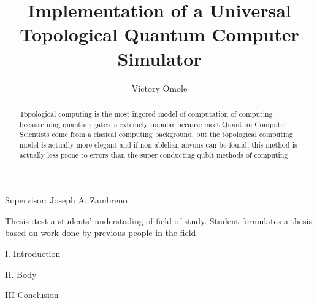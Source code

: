 \documentclass{article}
\begin{document}



\title{Implementation of a Universal Topological Quantum Computer Simulator}

\author{Victory Omole}



\maketitle
\newcommand\supervisor[1]{#1}
\supervisor{Supervisor: Joseph A. Zambreno}
\begin{abstract}
  Topological computing is the most ingored model of computation of computing because uing quantum gates is extemely popular because most Quantum Computer Scientists come from a clasical computing background, but the topological computing model is actually more elegant and if non-ablelian anyons can be found, this method is actually less prone to errors than the super conducting qubit methods of computing
\end{abstract}
Thesis :test a students' understading of field of study. Student formulates a thesis based on work done by previous people in the field

I. Introduction



II. Body



III Conclusion
\end{document}
